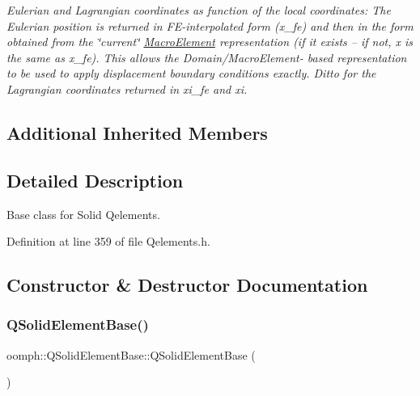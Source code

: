 \begin{DoxyCompactItemize}
\begin{DoxyCompactList}\small\item\em Eulerian and Lagrangian coordinates as function of the local coordinates\+: The Eulerian position is returned in F\+E-\/interpolated form ({\ttfamily x\+\_\+fe}) and then in the form obtained from the \char`\"{}current\char`\"{} \hyperlink{classoomph_1_1MacroElement}{Macro\+Element} representation (if it exists -- if not, {\ttfamily x} is the same as {\ttfamily x\+\_\+fe}). This allows the Domain/\+Macro\+Element-\/ based representation to be used to apply displacement boundary conditions exactly. Ditto for the Lagrangian coordinates returned in xi\+\_\+fe and xi. \end{DoxyCompactList}\end{DoxyCompactItemize}
\subsection*{Additional Inherited Members}


\subsection{Detailed Description}
Base class for Solid Qelements. 

Definition at line 359 of file Qelements.\+h.



\subsection{Constructor \& Destructor Documentation}
\mbox{\label{classoomph_1_1QSolidElementBase_a979a96e9b74885769d875a5a1dd6afb3}} 
\subsubsection{\texorpdfstring{Q\+Solid\+Element\+Base()}{QSolidElementBase()}\hspace{0.1cm}{\footnotesize\ttfamily [1/2]}}
{\footnotesize\ttfamily oomph\+::\+Q\+Solid\+Element\+Base\+::\+Q\+Solid\+Element\+Base (\begin{DoxyParamCaption}{ }\end{DoxyParamCaption})\hspace{0.3cm}{\ttfamily [inline]}}



